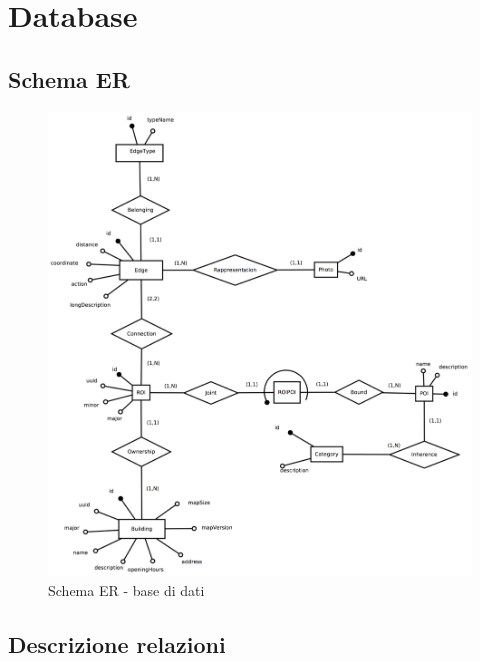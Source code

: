 \documentclass[../ManualeSviluppatore.tex]{subfiles}
\begin{document}
\section{Database}
	\subsection{Schema ER}
		\begin{figure} [h]
				\includegraphics[width=\textwidth]{img/Database}		
				\caption{Schema ER - base di dati}
				\label{Database}
		\end{figure}
	\subsection{Descrizione relazioni}
\end{document}
